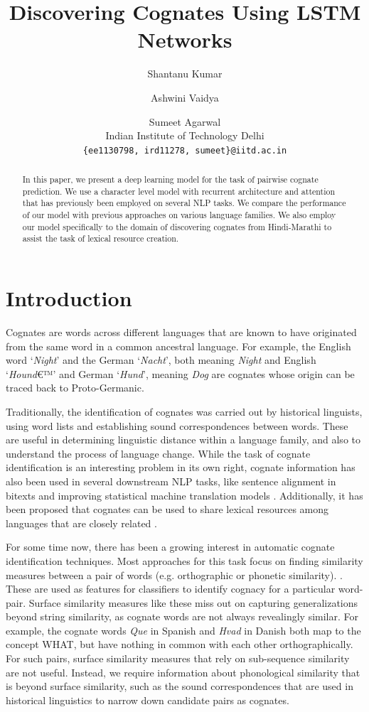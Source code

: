 \documentclass[11pt,letterpaper]{article}
\title{Discovering Cognates Using LSTM Networks}
\author{Shantanu Kumar \and Ashwini Vaidya \and Sumeet Agarwal \\ 
  Indian Institute of Technology Delhi
  \\ {\tt \{ee1130798, ird11278, sumeet\}@iitd.ac.in}}
\date{}
\begin{document}
\maketitle

\begin{abstract}
In this paper, we present a deep learning model for the task of pairwise cognate prediction. We use a character level model with recurrent architecture and attention that has previously been employed on several NLP tasks. We compare the performance of our model with previous approaches on various language families. We also employ our model specifically to the domain of discovering cognates from Hindi-Marathi to assist the task of lexical resource creation.
\end{abstract}

\section{Introduction}
Cognates are words across different languages that are known to have originated from the same word in a common ancestral language. For example, the English word `\textit{Night}' and the German `\textit{Nacht}', both meaning \textit{Night} and English `\textit{Hound}€™' and German `\textit{Hund}', meaning \textit{Dog} are cognates whose origin can be traced back to Proto-Germanic. 

Traditionally, the identification of cognates was carried out by historical linguists, using word lists and establishing sound correspondences between words. These are useful in determining linguistic distance within a language family, and also to understand the process of language change. While the task of cognate identification is an interesting problem in its own right, cognate information has also been used in several downstream NLP tasks, like sentence alignment in bitexts \cite{simard1993using} and improving statistical machine translation models \cite{kondrak2003cognates}. Additionally, it has been proposed that cognates can be used to share lexical resources among languages that are closely related \cite{Singh:07b}.

For some time now, there has been a growing interest in automatic cognate identification techniques. Most approaches for this task focus on finding similarity measures between a pair of words (e.g. orthographic or phonetic similarity). \cite{hauer2011clustering} \cite{inkpen2005similarity} \cite{List2016g}. These are used as features for classifiers to identify cognacy for a particular word-pair. Surface similarity measures like these miss out on capturing generalizations beyond string similarity, as cognate words are not always revealingly similar. For example, the cognate words \textit{Que} in Spanish and \textit{Hvad} in Danish both map to the concept \textsc{WHAT}, but have nothing in common with each other orthographically. For such pairs, surface similarity measures that rely on sub-sequence similarity are not useful. Instead, we require information about phonological similarity that is beyond surface similarity, such as the sound correspondences that are used in historical linguistics to narrow down candidate pairs as cognates.
\end{document}
